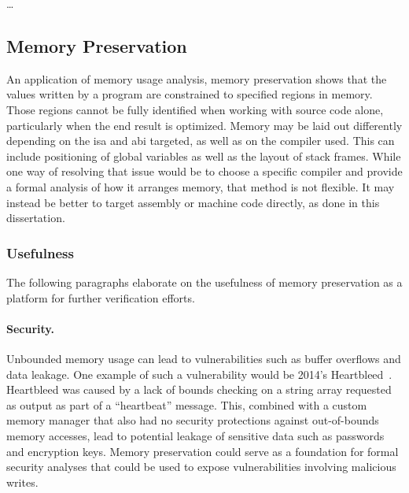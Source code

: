 \todo\dots

\subsection{Memory Preservation}
An application of memory usage analysis,
memory preservation shows that the values written by a program%
are constrained to specified regions in memory.
Those regions cannot be fully identified when working with source code alone,
particularly when the end result is optimized.
Memory may be laid out differently depending on the \ac{isa} and \ac{abi} targeted,
as well as on the compiler used.
This can include positioning of global variables
as well as the layout of stack frames.
While one way of resolving that issue would be to choose a specific compiler
and provide a formal analysis of how it arranges memory, that method is not flexible.
It may instead be better to target assembly or machine code directly,
as done in this dissertation.

\subsubsection{Usefulness}
The following paragraphs elaborate on the usefulness of memory preservation
as a platform for further verification efforts.

\paragraph{Security.}
Unbounded memory usage can lead to vulnerabilities
such as buffer overflows and data leakage.
One example of such a vulnerability would be 2014's Heartbleed~\citep{heartbleed}.
Heartbleed was caused by a lack of bounds checking on a string array
requested as output as part of a ``heartbeat'' message.
This, combined with a custom memory manager
that also had no security protections against out-of-bounds memory accesses,
lead to potential leakage of sensitive data such as passwords and encryption keys.
Memory preservation could serve as a foundation for formal security analyses
that could be used to expose vulnerabilities involving malicious writes.

